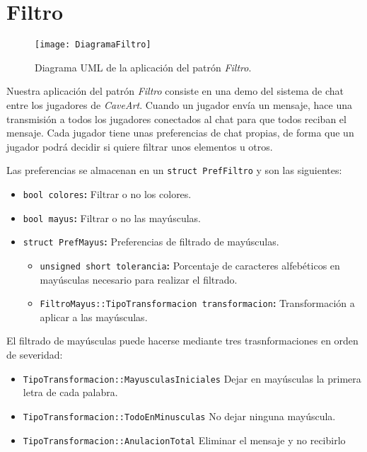 \section{Filtro}

\begin{figure}[ht!]
\begin{center}
	\texttt{[image: DiagramaFiltro]}
\end{center}
\caption{Diagrama UML de la aplicación del patrón \textit{Filtro}.}
\end{figure}

Nuestra aplicación del patrón \textit{Filtro} consiste en una demo del sistema de chat entre los jugadores de \textit{CaveArt}.
Cuando un jugador envía un mensaje, hace una transmisión a todos los jugadores conectados al chat para que todos reciban el mensaje.
Cada jugador tiene unas preferencias de chat propias, de forma que un jugador podrá decidir si quiere filtrar unos elementos u otros.

Las preferencias se almacenan en un \texttt{struct PrefFiltro} y son las siguientes:

\begin{itemize}
	\item\texttt{bool colores}\textbf{:}
		Filtrar o no los colores.
	\item\texttt{bool mayus}\textbf{:}
		Filtrar o no las mayúsculas.
	\item\texttt{struct PrefMayus}\textbf{:}
		Preferencias de filtrado de mayúsculas.
		\begin{itemize}
			\item\texttt{unsigned short tolerancia}\textbf{:}
				Porcentaje de caracteres alfebéticos en mayúsculas necesario para realizar el filtrado.
			\item\texttt{FiltroMayus::TipoTransformacion transformacion}\textbf{:}
				Transformación a aplicar a las mayúsculas.
		\end{itemize}
\end{itemize}

El filtrado de mayúsculas puede hacerse mediante tres trasnformaciones en orden de severidad:

\begin{itemize}
	\item\texttt{TipoTransformacion::MayusculasIniciales}
		Dejar en mayúsculas la primera letra de cada palabra.
	\item\texttt{TipoTransformacion::TodoEnMinusculas}
		No dejar ninguna mayúscula.
	\item\texttt{TipoTransformacion::AnulacionTotal}
		Eliminar el mensaje y no recibirlo
\end{itemize}

